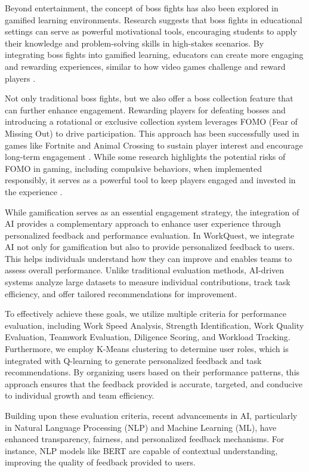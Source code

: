     Beyond entertainment, the concept of boss fights has also been explored in gamified learning environments. Research suggests that boss fights in educational settings can serve as powerful motivational tools, encouraging students to apply their knowledge and problem-solving skills in high-stakes scenarios. By integrating boss fights into gamified learning, educators can create more engaging and rewarding experiences, similar to how video games challenge and reward players \cite{gamification:Education}.

    Not only traditional boss fights, but we also offer a boss collection feature that can further enhance engagement. Rewarding players for defeating bosses and introducing a rotational or exclusive collection system leverages FOMO (Fear of Missing Out) to drive participation. This approach has been successfully used in games like Fortnite and Animal Crossing to sustain player interest and encourage long-term engagement \cite{medium:FOMO}. While some research highlights the potential risks of FOMO in gaming, including compulsive behaviors, when implemented responsibly, it serves as a powerful tool to keep players engaged and invested in the experience \cite{FOMO:1} \cite{FOMO:2}.

    While gamification serves as an essential engagement strategy, the integration of AI provides a complementary approach to enhance user experience through personalized feedback and performance evaluation. In WorkQuest, we integrate AI not only for gamification but also to provide personalized feedback to users. This helps individuals understand how they can improve and enables teams to assess overall performance. Unlike traditional evaluation methods, AI-driven systems analyze large datasets to measure individual contributions, track task efficiency, and offer tailored recommendations for improvement.

    To effectively achieve these goals, we utilize multiple criteria for performance evaluation, including Work Speed Analysis, Strength Identification, Work Quality Evaluation, Teamwork Evaluation, Diligence Scoring, and Workload Tracking. Furthermore, we employ K-Means clustering to determine user roles, which is integrated with Q-learning to generate personalized feedback and task recommendations. By organizing users based on their performance patterns, this approach ensures that the feedback provided is accurate, targeted, and conducive to individual growth and team efficiency.

    Building upon these evaluation criteria, recent advancements in AI, particularly in Natural Language Processing (NLP) and Machine Learning (ML), have enhanced transparency, fairness, and personalized feedback mechanisms. For instance, NLP models like BERT are capable of contextual understanding, improving the quality of feedback provided to users. \cite{AI:humanResource}


